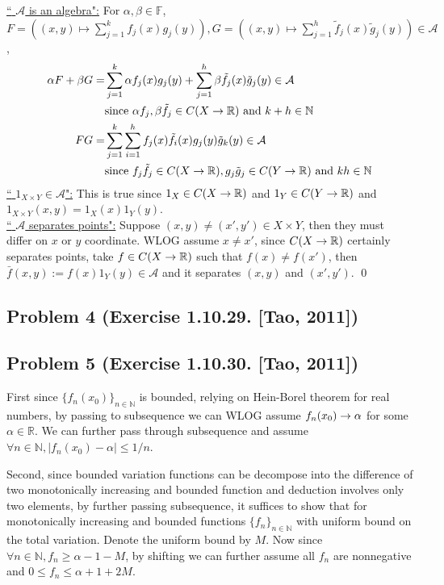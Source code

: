 \documentclass[12pt,a4paper]{article}
\newcommand{\ra}[1]{\ifnum #1=1\rightarrow\fi\ifnum #1=2\Rightarrow\fi}
\newcommand{\onum}[1]{\raisebox{.5pt}{\textcircled{\raisebox{-1pt} {#1}}}}
\newcommand{\claim}[1]{\underline{``{#1}":}}
\newcommand{\bga}{\begin{align*}}
\renewcommand{\l}{\left}\renewcommand{\r}{\right}
\newcommand{\SUM}[2]{\sum\limits_{#1}^{#2}}
\newcommand{\x}{\times}
\newcommand{\R}{\mathbb R}%
\newcommand{\N}{\mathbb N}%
\begin{document}
\claim{\onum1 $\mathcal A$ is an algebra} For $\alpha, \beta \in\mathbb F$, $F = \l((x, y)\mapsto \SUM{j=1}k f_j(x)g_j(y)\r), G = \l((x, y) \mapsto \SUM{j=1}h \tilde f_j(x)\tilde g_j(y)\r) \in \mathcal A$, 
\bga
\alpha F + \beta G
=& \SUM{j=1}k \alpha f_j(x)g_j(y) + \SUM{j=1}h \beta \tilde f_j(x)\tilde g_j(y) \in \mathcal A\\
& \text{since } \alpha f_j, \beta \tilde f_j\in C(X \ra1 \R) \text{ and } k+h \in \N\\
FG
= & \SUM{j=1}k\SUM{i=1}h f_j(x)\tilde f_i(x) g_j(y)\tilde g_k(y) \in \mathcal A \\
& \text{since } f_j\tilde f_j \in C(X \ra1 \R), g_j \tilde g_j\in C(Y\ra1\R) \text{ and } kh \in \N
\end{align*}
\claim{\onum2 $1_{X\x Y} \in \mathcal A$} This is true since $1_X \in C(X \ra1\R)$ and $1_Y \in C(Y\ra1\R)$ and $1_{X\x Y}(x, y) = 1_X(x) 1_Y(y)$. \\
\claim{\onum3 $\mathcal A$ separates points} Suppose $(x, y) \neq (x', y') \in X \x Y$, then they must differ on $x$ or $y$ coordinate. WLOG assume $x \neq x'$, since $C(X \ra1\R)$ certainly separates points, take $f\in C(X \ra1 \R)$ such that $f(x) \neq f(x')$, then $\bar f(x, y) := f(x) 1_Y(y) \in \mathcal A$ and it separates $(x, y)$ and $(x', y')$. \qed

\newpage\subsection*{Problem 4 (Exercise 1.10.29. [Tao, 2011])}
\red{  }
\newpage\subsection*{Problem 5 (Exercise 1.10.30. [Tao, 2011])}
First since $\{f_n(x_0)\}_{n\in\N}$ is bounded, relying on Hein-Borel theorem for real numbers, by passing to subsequence we can WLOG assume $f_n(x_0) \ra1 \alpha$ for some $\alpha \in \R$. We can further pass through subsequence and assume $\forall n\in\N, |f_n(x_0) - \alpha| \leq 1/n$. 

Second, since bounded variation functions can be decompose into the difference of two monotonically increasing and bounded function and deduction involves only two elements, by further passing subsequence, it suffices to show that for monotonically increasing and bounded functions $\{f_n\}_{n\in\N}$ with uniform bound on the total variation. Denote the uniform bound by $M$. Now since $\forall n\in \N, f_n \geq \alpha -1 - M$, by shifting we can further assume all $f_n$ are nonnegative and $0 \leq f_n \leq \alpha + 1 + 2M$. 
\end{document}
